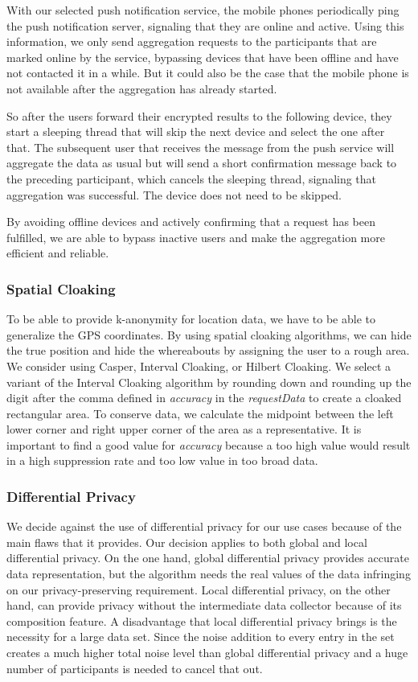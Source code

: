 With our selected push notification service, the mobile phones periodically ping the push notification server, signaling that they are online and active. Using this information, we only send aggregation requests to the participants that are marked online by the service, bypassing devices that have been offline and have not contacted it in a while. But it could also be the case that the mobile phone is not available after the aggregation has already started.

So after the users forward their encrypted results to the following device, they start a sleeping thread that will skip the next device and select the one after that. The subsequent user that receives the message from the push service will aggregate the data as usual but will send a short confirmation message back to the preceding participant, which cancels the sleeping thread, signaling that aggregation was successful. The device does not need to be skipped.

By avoiding offline devices and actively confirming that a request has been fulfilled, we are able to bypass inactive users and make the aggregation more efficient and reliable.

\subsubsection{Spatial Cloaking}
To be able to provide k-anonymity for location data, we have to be able to generalize the GPS coordinates. By using spatial cloaking algorithms, we can hide the true position and hide the whereabouts by assigning the user to a rough area. We consider using Casper, Interval Cloaking, or Hilbert Cloaking. We select a variant of the Interval Cloaking algorithm by rounding down and rounding up the digit after the comma defined in \textit{accuracy} in the \textit{requestData} to create a cloaked rectangular area. To conserve data, we calculate the midpoint between the left lower corner and right upper corner of the area as a representative. It is important to find a good value for \textit{accuracy} because a too high value would result in a high suppression rate and too low value in too broad data. 

\subsubsection{Differential Privacy}
We decide against the use of differential privacy for our use cases because of the main flaws that it provides. Our decision applies to both global and local differential privacy. On the one hand, global differential privacy provides accurate data representation, but the algorithm needs the real values of the data infringing on our privacy-preserving requirement. Local differential privacy, on the other hand, can provide privacy without the intermediate data collector because of its composition feature. A disadvantage that local differential privacy brings is the necessity for a large data set. Since the noise addition to every entry in the set creates a much higher total noise level than global differential privacy and a huge number of participants is needed to cancel that out. 

